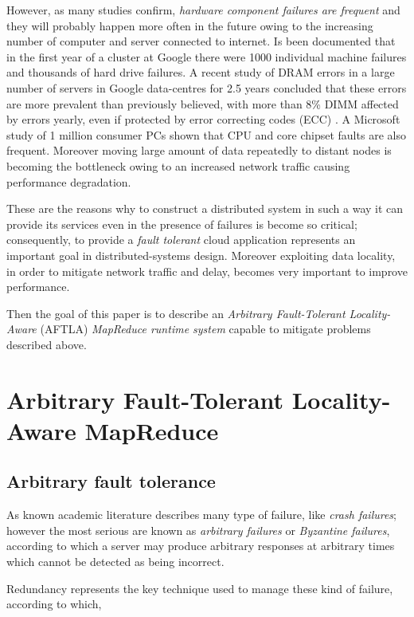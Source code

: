 \documentclass[sigchi]{acmart}
\begin{document}
However, as many studies confirm, \textit{hardware component failures are frequent} and they will probably happen more often in the future owing to the increasing number of computer and server connected to internet. Is been documented that in the first year of a cluster at Google there were 1000 individual machine failures and thousands of hard drive failures. A recent study of DRAM errors in a large number of servers in Google data-centres for 2.5 years concluded that these errors are more prevalent than previously believed, with more than 8\% DIMM affected by errors yearly, even if protected by error correcting codes (ECC) \cite{Abril07}. A Microsoft study of 1 million consumer PCs shown that CPU and core chipset faults are also frequent. \cite{Abril07} Moreover moving large amount of data repeatedly to distant nodes is becoming the bottleneck owing to an increased network traffic causing performance degradation.

These are the reasons why to construct a distributed system in such a way it can provide its services even in the presence of failures is become so critical; consequently, to provide a \textit{fault tolerant} cloud application represents an important goal in distributed-systems design. Moreover exploiting data locality, in order to mitigate network traffic and delay, becomes very important to improve performance.

Then the goal of this paper is to describe an \textit{Arbitrary Fault-Tolerant Locality-Aware} (AFTLA) \textit{MapReduce runtime system} capable to mitigate problems described above. 

\section{Arbitrary Fault-Tolerant Locality-Aware MapReduce}

\subsection{Arbitrary fault tolerance}

As known academic literature describes many type of failure, like \textit{crash failures}; however the most serious are known as \textit{arbitrary failures} or \textit{Byzantine failures}, according to which a server may produce arbitrary responses at arbitrary times which cannot be detected as being incorrect. 

Redundancy represents the key technique used to manage these kind of failure, according to which, 
\end{document}
